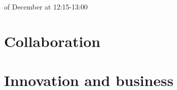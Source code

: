 



\setlength{\parindent}{0pt}
\setlength{\parskip}{0.7\baselineskip}%
\thispagestyle{empty}
%
\clearpage
\fancyfoot{}
\fancyfoot[CO,CE]{\thepage}



% 


\pagestyle{fancy}
\fancyfoot{}of December at 12:15-13:00
\setcounter{page}{1}
\fancyfoot[LO,RE]{\thepage}

\section{Collaboration}




 




\clearpage
\section{Innovation and business}






